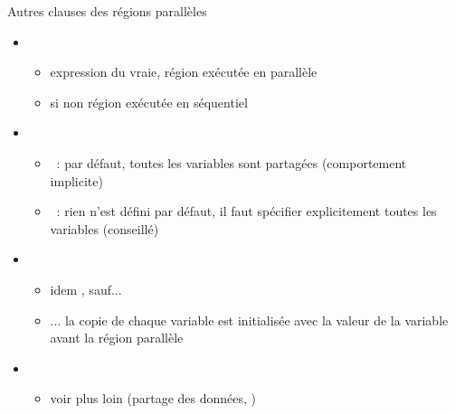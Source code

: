 \begin {frame} {Autres clauses des régions parallèles}
    \begin {itemize}
	\item {}

	    \begin {itemize}
		\item expression du  vraie,
		    \implique région exécutée en parallèle
		\item si non \implique  région exécutée en séquentiel
	    \end {itemize}

	\item {}

	    \begin {itemize}

		\item {}~: par défaut, toutes
		    les variables sont partagées
		    (\implique comportement implicite)

		\item {}~: rien n'est défini
		    par défaut, il faut spécifier explicitement toutes
		    les variables
		    (\implique conseillé)

	    \end {itemize}

	\item {}

	    \begin {itemize}
		\item idem , sauf...
		\item ... la copie de chaque variable est initialisée avec
		    la valeur de la variable avant la
		    région parallèle
	    \end {itemize}

	\item {}

	    \begin {itemize}
		\item voir plus loin (partage des données,
		    )
	    \end {itemize}

    \end {itemize}

\end {frame}



